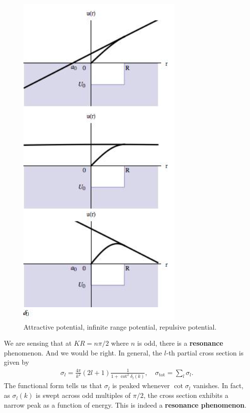 \documentclass{book}
\theoremstyle{definition}
\newcommand{\f}[2]{\frac{#1}{#2}}
\begin{document}
\begin{figure}[!htb]
	\centering
	\includegraphics[scale=0.7]{figures/a0.png}
	\caption{Attractive potential, infinite range potential, repulsive potential.}
\end{figure}



We are sensing that at $KR = n\pi/2$ where $n$ is odd, there is a \textbf{resonance} phenomenon. And we would be right. In general, the $l$-th partial cross section is given by 
\begin{align*}
	\sigma_l = \f{4\pi}{k^2}(2l+1) \f{1}{1+ \cot^2\delta_l(k)}, \quad \sigma_\text{tot} = \sum_l \sigma_l.
\end{align*}
The functional form tells us that $\sigma_l$ is peaked whenever $\cot\sigma_l$ vanishes. In fact, as $\sigma_l(k)$ is swept across odd multiples of  $\pi/2$, the cross section exhibits a narrow peak as a function of energy. This is indeed a \textbf{resonance phenomenon}. \\
\end{document}
